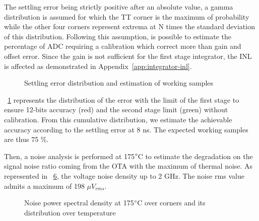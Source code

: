 The settling error being strictly positive after an absolute value, a gamma distribution is assumed for which the TT corner is the maximum of probability while the other four corners represent extrema at N times the standard deviation of this distribution. Following this assumption, is possible to estimate the percentage of ADC requiring a calibration which correct more than gain and offset error. Since the gain is not sufficient for the first stage integrator, the INL is affected as demonstrated in Appendix~\ref{app:integrator-inl}.

\begin{figure}[htp]
    \centering
    \begin{subfigure}[b]{0.39\textwidth}
        \resizebox{\textwidth}{!}{
            
        }
        \label{fig:ota_error_dist}
    \end{subfigure}
    \begin{subfigure}[b]{0.58\textwidth}
        \resizebox{\textwidth}{!}{
            
        }
        \label{fig:ota_working_samples}
    \end{subfigure}
    \caption{Settling error distribution and estimation of working samples}
    \label{fig:ota_dist_sample}
\end{figure}

\figurename~\ref{fig:ota_error_dist} represents the distribution of the error with the limit of the first stage to ensure 12-bits accuracy (red) and the second stage limit (green) without calibration. From this cumulative distribution, we estimate the achievable accuracy according to the settling error at 8 ns. The expected working samples are thus 75 \%. 

Then, a noise analysis is performed at 175\(\degree \)C to estimate the degradation on the signal noise ratio coming from the OTA with the maximum of thermal noise. As represented in \figurename~\ref{fig:ota_noise_psd}, the voltage noise density up to 2 GHz. The noise rms value admits a maximum of 198 \(\mu V_{rms} \).

\begin{figure}[htp]
    \centering
    \begin{subfigure}[b]{0.43\textwidth}
        \resizebox{\textwidth}{!}{
            
        }
        \label{fig:noise_spectral_density}
    \end{subfigure}
    \begin{subfigure}[b]{0.56\textwidth}
        \resizebox{\textwidth}{!}{
            
        }
        \label{fig:noise_spectral_density}
    \end{subfigure}
    \caption{Noise power spectral density at 175\(\degree \)C over corners and its distribution over temperature}
    \label{fig:ota_noise_psd}
\end{figure}
\clearpage

